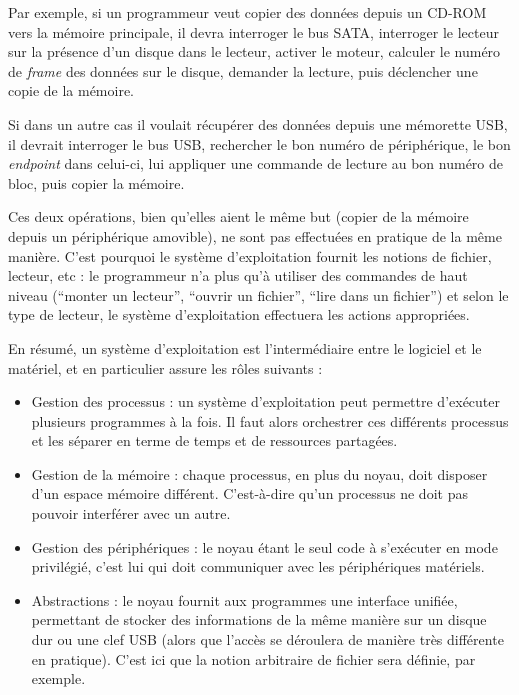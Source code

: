 Par exemple, si un programmeur veut copier des données depuis un CD-ROM vers la
mémoire principale, il devra interroger le bus SATA, interroger le lecteur sur
la présence d'un disque dans le lecteur, activer le moteur, calculer le numéro
de \emph{frame} des données sur le disque, demander la lecture, puis déclencher
une copie de la mémoire.

Si dans un autre cas il voulait récupérer des données depuis une mémorette USB,
il devrait interroger le bus USB, rechercher le bon numéro de périphérique, le
bon \emph{endpoint} dans celui-ci, lui appliquer une commande de lecture au bon
numéro de bloc, puis copier la mémoire.

Ces deux opérations, bien qu'elles aient le même but (copier de la mémoire
depuis un périphérique amovible), ne sont pas effectuées en pratique de la même
manière. C'est pourquoi le système d'exploitation fournit les notions de
fichier, lecteur, etc : le programmeur n'a plus qu'à utiliser des commandes de
haut niveau (``monter un lecteur'', ``ouvrir un fichier'', ``lire dans un
fichier'') et selon le type de lecteur, le système d'exploitation effectuera les
actions appropriées.

En résumé, un système d'exploitation est l'intermédiaire entre le logiciel et
le matériel, et en particulier assure les rôles suivants :

\begin{itemize}
\item
  Gestion des processus : un système d'exploitation peut permettre
  d'exécuter plusieurs programmes à la fois. Il faut alors orchestrer
  ces différents processus et les séparer en terme de temps et de
  ressources partagées.
\item
  Gestion de la mémoire : chaque processus, en plus du noyau, doit
  disposer d'un espace mémoire différent. C'est-à-dire qu'un processus
  ne doit pas pouvoir interférer avec un autre.
\item
  Gestion des périphériques : le noyau étant le seul code à s'exécuter
  en mode privilégié, c'est lui qui doit communiquer avec les
  périphériques matériels.
\item
  Abstractions : le noyau fournit aux programmes une interface unifiée,
  permettant de stocker des informations de la même manière sur un
  disque dur ou une clef USB (alors que l'accès se déroulera de manière
  très différente en pratique). C'est ici que la notion arbitraire de
  fichier sera définie, par exemple.
\end{itemize}


